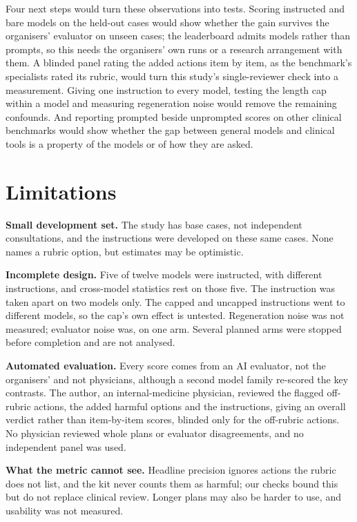\documentclass[11pt]{article}
\begin{document}
Four next steps would turn these observations into tests. Scoring instructed and bare models on the
held-out cases would show whether the gain survives the organisers' evaluator on unseen cases; the
leaderboard admits models rather than prompts, so this needs the organisers' own runs or a research
arrangement with them. A blinded panel rating the added actions item by item, as the benchmark's
specialists rated its rubric, would turn this study's single-reviewer check into a measurement. Giving
one instruction to every model, testing the length cap within a model and measuring regeneration
noise would remove the remaining confounds. And reporting prompted beside unprompted scores on other
clinical benchmarks would show whether the gap between general models and clinical tools is a
property of the models or of how they are asked.

\section{Limitations}
\label{sec:limitations}
\textbf{Small development set.} The study has \nCases{} base cases, not \nItems{} independent
consultations, and the instructions were developed on these same cases. None names a rubric option,
but estimates may be optimistic.

\textbf{Incomplete design.} Five of twelve models were instructed, with different instructions, and
cross-model statistics rest on those five. The instruction was taken apart on two models only. The
capped and uncapped instructions went to different models, so the cap's own effect is untested.
Regeneration noise was not measured; evaluator noise was, on one arm. Several planned arms were
stopped before completion and are not analysed.

\textbf{Automated evaluation.} Every score comes from an AI evaluator, not the organisers' and not
physicians, although a second model family re-scored the key contrasts. The author, an
internal-medicine physician, reviewed the flagged off-rubric actions, the added harmful options and
the instructions, giving an overall verdict rather than item-by-item scores, blinded only for the
off-rubric actions. No physician reviewed whole plans or evaluator disagreements, and no independent
panel was used.

\textbf{What the metric cannot see.} Headline precision ignores actions the rubric does not list, and
the kit never counts them as harmful; our checks bound this but do not replace clinical review.
Longer plans may also be harder to use, and usability was not measured.
\end{document}
